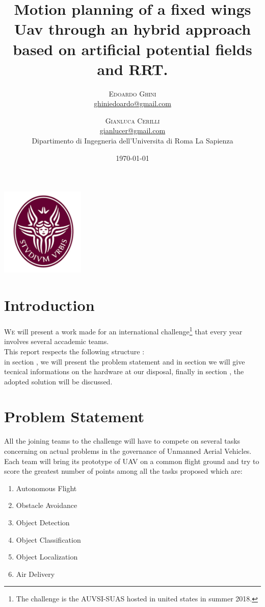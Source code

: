 \documentclass[oneside,onecolumn]{article}
\title{Motion planning of a fixed wings Uav through an hybrid approach based on artificial potential
  fields and RRT. } %
\author{%
  \textsc{Edoardo Ghini} \\[1ex] %
  \normalsize \href{mailto:ghiniedoardo@gmail.com}{ghiniedoardo@gmail.com} %
  \and %
  \textsc{Gianluca Cerilli} \\[1ex] %
  \normalsize \href{mailto:gianlucer@gmail.com}{gianlucer@gmail.com}\\ %
  \normalsize Dipartimento di Ingegneria dell'Universita di Roma La Sapienza\\
}
\date{\today} %
\begin{document}
\maketitle
\bigskip
\bigskip
\bigskip
\bigskip
\begin{center}
  \includegraphics[width=0.3\textwidth]{laSapienza}
\end{center}

\newpage
\section{Introduction}

\lettrine[nindent=0em,lines=3]{W}e will present a work made
for an international challenge\footnote{The challenge is the AUVSI-SUAS hosted
  in united states in summer 2018.} that every year involves several accademic teams.\\
This report respects the following structure : \\
in section , we will present the problem statement and in section
 we will give tecnical informations on the hardware at our disposal,
finally in section , the adopted solution will be discussed.

\section{Problem Statement}
All the joining teams to the challenge will have to compete on several tasks
concerning on actual problems in the governance of Unmanned Aerial Vehicles.\\
Each team will bring its prototype of UAV on a common flight ground and try to
score the greatest number of points among all the tasks proposed which are:
\begin{enumerate}\centering
\item Autonomous Flight
\item Obstacle Avoidance
\item Object Detection
\item Object Classification
\item Object Localization 
\item Air Delivery
\end{enumerate}
\end{document}
